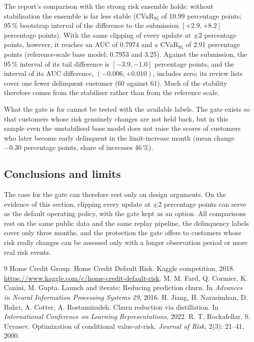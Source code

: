 The report's comparison with the strong risk ensemble holds: without stabilisation the ensemble is far less stable (CVaR$_{95}$ of 10.99 percentage points; 95\,\% bootstrap interval of the difference to the submission $[+2.9, +8.2]$ percentage points). With the same clipping of every update at $\pm2$ percentage points, however, it reaches an AUC of 0.7974 and a CVaR$_{95}$ of 2.91 percentage points (reference-scale base model: 0.7953 and 3.25). Against the submission, the 95\,\% interval of its tail difference is $[-3.9, -1.0]$ percentage points, and the interval of its AUC difference, $(-0.006, +0.010)$, includes zero; its review lists cover one fewer delinquent customer (60 against 61). Much of the stability therefore comes from the stabiliser rather than from the reference scale.

What the gate is for cannot be tested with the available labels. The gate exists so that customers whose risk genuinely changes are not held back, but in this sample even the unstabilised base model does not raise the scores of customers who later become early delinquent in the limit-increase month (mean change $-0.30$ percentage points, share of increases 46\,\%).

\subsection{Conclusions and limits}
The case for the gate can therefore rest only on design arguments. On the evidence of this section, clipping every update at $\pm2$ percentage points can serve as the default operating policy, with the gate kept as an option. All comparisons rest on the same public data and the same replay pipeline, the delinquency labels cover only three months, and the protection the gate offers to customers whose risk really changes can be assessed only with a longer observation period or more real risk events.

\begin{thebibliography}{9}
 Home Credit Group. Home Credit Default Risk. Kaggle competition, 2018. \url{https://www.kaggle.com/c/home-credit-default-risk}.
 M. M. Fard, Q. Cormier, K. Canini, M. Gupta. Launch and iterate: Reducing prediction churn. In \emph{Advances in Neural Information Processing Systems 29}, 2016.
 H. Jiang, H. Narasimhan, D. Bahri, A. Cotter, A. Rostamizadeh. Churn reduction via distillation. In \emph{International Conference on Learning Representations}, 2022.
 R. T. Rockafellar, S. Uryasev. Optimization of conditional value-at-risk. \emph{Journal of Risk}, 2(3): 21--41, 2000.
\end{thebibliography}

